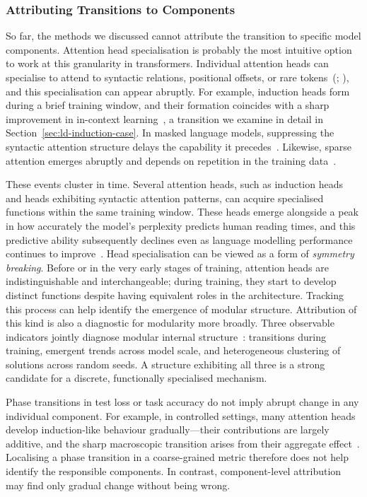 \subsubsection{Attributing Transitions to Components}
\label{sec:ld-attribution}

So far, the methods we discussed cannot attribute the transition to specific model components. Attention head specialisation is probably the most intuitive option to work at this granularity in transformers. Individual attention heads can specialise to attend to syntactic relations, positional offsets, or rare tokens~(; ), and this specialisation can appear abruptly. For example, induction heads form during a brief training window, and their formation coincides with a sharp improvement in in-context learning~, a transition we examine in detail in Section~\ref{sec:ld-induction-case}. In masked language models, suppressing the syntactic attention structure delays the capability it precedes~. Likewise, sparse attention emerges abruptly and depends on repetition in the training data~.

These events cluster in time. Several attention heads, such as induction heads and heads exhibiting syntactic attention patterns, can acquire specialised functions within the same training window. These heads emerge alongside a peak in how accurately the model's perplexity predicts human reading times, and this predictive ability subsequently declines even as language modelling performance continues to improve~. Head specialisation can be viewed as a form of \emph{symmetry breaking}. Before or in the very early stages of training, attention heads are indistinguishable and interchangeable; during training, they start to develop distinct functions despite having equivalent roles in the architecture. Tracking this process can help identify the emergence of modular structure. Attribution of this kind is also a diagnostic for modularity more broadly. Three observable indicators jointly diagnose modular internal structure~: transitions during training, emergent trends across model scale, and heterogeneous clustering of solutions across random seeds. A structure exhibiting all three is a strong candidate for a discrete, functionally specialised mechanism.



\begin{insightbox}
Phase transitions in test loss or task accuracy do not imply abrupt change in any individual component. For example, in controlled settings, many attention heads develop induction-like behaviour gradually---their contributions are largely additive, and the sharp macroscopic transition arises from their aggregate effect~. Localising a phase transition in a coarse-grained metric therefore does not help identify the responsible components. In contrast, component-level attribution may find only gradual change without being wrong.
\end{insightbox}


